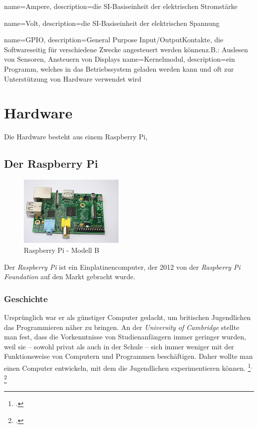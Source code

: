 
{
  name=Ampere,
  description={die SI-Basiseinheit der elektrischen Stromstärke}
}

{
  name=Volt,
  description={die SI-Basiseinheit der elektrischen Spannung}
}

{
  name=GPIO,
  description={General Purpose Input/Output\newline Kontakte, die Softwareseitig für verschiedene Zwecke angesteuert werden können\newline z.B.: Auslesen von Sensoren, Ansteuern von Displays}
}
{
  name=Kernelmodul,
  description={ein Programm, welches in das Betriebssystem geladen werden kann und oft zur Unterstützung von Hardware verwendet wird}
}

\chapter{Hardware}

Die Hardware besteht aus einem Raspberry Pi, 
\section{Der Raspberry Pi}
\begin{figure}
 \vspace{-16pt}
 \centering 
 \includegraphics[width=0.45\textwidth]{figures/raspberry.jpg}
 \caption[Raspberry Pi - Modell B]{Raspberry Pi - Modell B\footnotemark}
 \vspace{-50pt}
\end{figure}
Der \textit{Raspberry Pi} ist ein Einplatinencomputer, der 2012 von der  \textit{Raspberry Pi Foundation} auf den Markt gebracht wurde. 
\subsection{Geschichte}
Ursprünglich war er als günstiger Computer gedacht, um britischen Jugendlichen das Programmieren näher zu bringen. An der \textit{University of Cambridge} stellte man fest, dass die Vorkenntnisse von Studienanfängern immer geringer wurden, weil sie -- sowohl privat als auch in der Schule -- sich immer weniger mit der Funktionsweise von Computern und Programmen beschäftigen. Daher wollte man einen Computer entwickeln, mit dem die Jugendlichen experimentieren können.
\footcite{aboutraspberry}$^,$
\footcite{wiki:raspi_geschichte}

